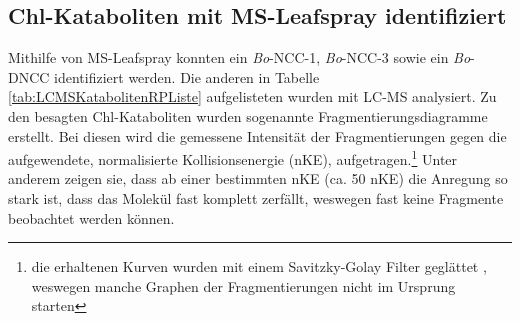 \documentclass[12pt,a4paper]{article}
\begin{document}
\subsection{Chl-Kataboliten mit MS-Leafspray identifiziert}

Mithilfe von MS-Leafspray konnten ein \textit{Bo}-NCC-1, \textit{Bo}-NCC-3 sowie ein \textit{Bo}-DNCC identifiziert werden. Die anderen in Tabelle \ref{tab:LCMSKatabolitenRPListe} aufgelisteten wurden mit LC-MS analysiert. Zu den besagten Chl-Kataboliten wurden sogenannte Fragmentierungsdiagramme erstellt. Bei diesen wird die gemessene Intensität der Fragmentierungen gegen die aufgewendete, normalisierte Kollisionsenergie (nKE), aufgetragen.\footnote{die erhaltenen Kurven wurden mit einem Savitzky-Golay Filter geglättet \cite{scipy}, weswegen manche Graphen der Fragmentierungen nicht im Ursprung starten} Unter anderem zeigen sie, dass ab einer bestimmten nKE (ca. 50 nKE) die Anregung so stark ist, dass das Molekül fast komplett zerfällt, weswegen fast keine Fragmente beobachtet werden können. 
\end{document}
